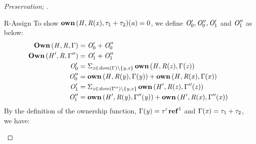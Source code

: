 \begin{proof}[Preservation; ]
\begin{rneqncase}{R-Assign}
    To show $\mathbf{own} \, (  \mathit{H}  ,  \mathit{R}  (  \mathit{x}  )  ,  \tau_{{\mathrm{1}}}  +  \tau_{{\mathrm{2}}}  )  (  \mathit{a}  )  =  0$, 
    we define $\mathit{O'_{{\mathrm{0}}}}, \mathit{O''_{{\mathrm{0}}}}, \mathit{O'_{{\mathrm{1}}}}$ and $\mathit{O''_{{\mathrm{1}}}}$ as below:
    \begin{align*}
      \mathbf{Own} \, (  \mathit{H}  ,  \mathit{R}  ,  \Gamma  ) & = \mathit{O'_{{\mathrm{0}}}}  +  \mathit{O''_{{\mathrm{0}}}} \\
      \mathbf{Own} \, (  \mathit{H'}  ,  \mathit{R}  ,  \Gamma''  ) & = \mathit{O'_{{\mathrm{1}}}}  +  \mathit{O''_{{\mathrm{1}}}} \\
      \mathit{O'_{{\mathrm{0}}}} & =  \Sigma _{ \mathit{z} \in   \mathit{dom}( \Gamma )   \setminus  \{  \mathit{y}  ,  \mathit{x}  \}  }\, \mathbf{own} \, (  \mathit{H}  ,  \mathit{R}  (  \mathit{z}  )  ,  \Gamma  (  \mathit{z}  )  )  \\
      \mathit{O''_{{\mathrm{0}}}} &= \mathbf{own} \, (  \mathit{H}  ,  \mathit{R}  (  \mathit{y}  )  ,  \Gamma  (  \mathit{y}  )  )  +  \mathbf{own} \, (  \mathit{H}  ,  \mathit{R}  (  \mathit{x}  )  ,  \Gamma  (  \mathit{x}  )  ) \\
      \mathit{O'_{{\mathrm{1}}}} & =  \Sigma _{ \mathit{z} \in   \mathit{dom}( \Gamma'' )   \setminus  \{  \mathit{y}  ,  \mathit{x}  \}  }\, \mathbf{own} \, (  \mathit{H'}  ,  \mathit{R}  (  \mathit{z}  )  ,  \Gamma''  (  \mathit{z}  )  )  \\
      \mathit{O''_{{\mathrm{1}}}} &= \mathbf{own} \, (  \mathit{H'}  ,  \mathit{R}  (  \mathit{y}  )  ,  \Gamma''  (  \mathit{y}  )  )  +  \mathbf{own} \, (  \mathit{H'}  ,  \mathit{R}  (  \mathit{x}  )  ,  \Gamma''  (  \mathit{x}  )  )
    \end{align*}
    By the definition of the ownership function, $\Gamma  (  \mathit{y}  )  =   \tau'  \operatorname{\mathbf{ref}}^{ 1 } $ and $\Gamma  (  \mathit{x}  )  =  \tau_{{\mathrm{1}}}  +  \tau_{{\mathrm{2}}}$, we have:

\end{rneqncase}
\end{proof}
